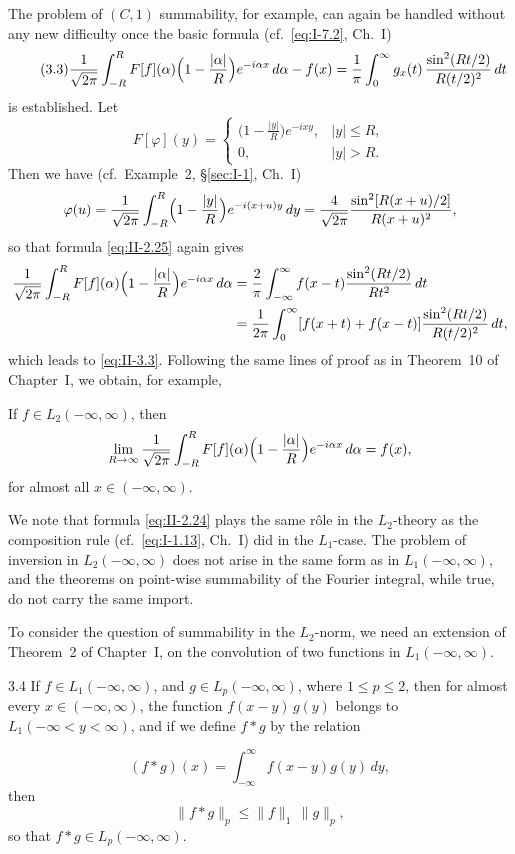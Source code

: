 The problem of $(C,1)$ summability, for example, can again be handled without any new difficulty once the basic formula (cf.\ \eqref{eq:I-7.2}, Ch.~I)
\begin{equation}\tag{3.3}\label{eq:II-3.3}
\frac{1}{\sqrt{2\pi}}\int_{-R}^{R}F[f](\alpha)\Bigl(1-\frac{|\alpha|}{R}\Bigr)e^{-i\alpha x}\,d\alpha-f(x)
=\frac{1}{\pi}\int_{0}^{\infty}g_{x}(t)\,\frac{\sin^{2}(Rt/2)}{R(t/2)^{2}}\,dt
\end{equation}
is established. Let
\[
F[\varphi](y)=
\begin{cases}
\bigl(1-\frac{|y|}{R}\bigr)e^{-ixy}, & |y|\le R,\\
0, & |y|>R.
\end{cases}
\]
Then we have (cf.\ Example~2, \S\ref{sec:I-1}, Ch.~I)
\[
\varphi(u)=\frac{1}{\sqrt{2\pi}}\int_{-R}^{R}\Bigl(1-\frac{|y|}{R}\Bigr)e^{-i(x+u)y}\,dy
=\frac{4}{\sqrt{2\pi}}\frac{\sin^{2}[R(x+u)/2]}{R(x+u)^{2}},
\]
so that formula \eqref{eq:II-2.25} again gives
\[
\begin{aligned}
\frac{1}{\sqrt{2\pi}}\int_{-R}^{R}F[f](\alpha)\Bigl(1-\frac{|\alpha|}{R}\Bigr)e^{-i\alpha x}\,d\alpha &= \frac{2}{\pi}\int_{-\infty}^{\infty}f(x-t)\frac{\sin^{2}(Rt/2)}{Rt^{2}}\,dt\\
&= \frac{1}{2\pi}\int_{0}^{\infty}[f(x+t)+f(x-t)]\frac{\sin^{2}(Rt/2)}{R(t/2)^{2}}\,dt,
\end{aligned}
\]
which leads to \eqref{eq:II-3.3}. Following the same lines of proof as in Theorem~10 of Chapter~I, we obtain, for example,

\begin{theorem}\label{thm:II-3}
If $f\in L_{2}(-\infty,\infty)$, then
\[
\lim_{R\to\infty}\frac{1}{\sqrt{2\pi}}\int_{-R}^{R}F[f](\alpha)\Bigl(1-\frac{|\alpha|}{R}\Bigr)e^{-i\alpha x}\,d\alpha=f(x),
\]
for almost all $x\in(-\infty,\infty)$.
\end{theorem}

We note that formula \eqref{eq:II-2.24} plays the same r\^ole in the $L_{2}$-theory as the composition rule (cf.\ \eqref{eq:I-1.13}, Ch.~I) did in the $L_{1}$-case. The problem of inversion in $L_{2}(-\infty,\infty)$ does not arise in the same form as in $L_{1}(-\infty,\infty)$, and the theorems on point-wise summability of the Fourier integral, while true, do not carry the same import.

To consider the question of summability in the $L_{2}$-norm, we need an extension of Theorem~2 of Chapter~I, on the convolution of two functions in $L_{1}(-\infty,\infty)$.

\begin{nstmt}{3.4}\label{eq:II-3.4}
If $f\in L_{1}(-\infty,\infty)$, and $g\in L_{p}(-\infty,\infty)$, where $1\le p\le 2$, then for almost every $x\in(-\infty,\infty)$, the function $f(x-y)\,g(y)$ belongs to $L_{1}(-\infty<y<\infty)$, and if we define $f*g$ by the relation
\end{nstmt}
\[
(f*g)(x)=\int_{-\infty}^{\infty}f(x-y)g(y)\,dy,
\]
then
\begin{equation}\tag{3.5}\label{eq:II-3.5}
\|f*g\|_{p}\le \|f\|_{1}\,\|g\|_{p},
\end{equation}
so that $f*g\in L_{p}(-\infty,\infty)$.

